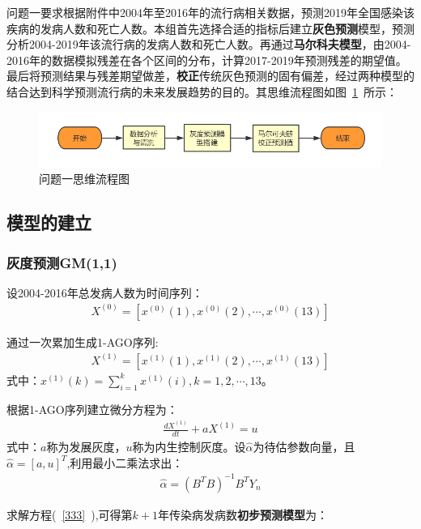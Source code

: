 \documentclass{whutmod}
\begin{document}
    问题一要求根据附件中2004年至2016年的流行病相关数据，预测2019年全国感染该疾病的发病人数和死亡人数。本组首先选择合适的指标后建立\textbf{灰色预测}模型，预测分析2004-2019年该流行病的发病人数和死亡人数。再通过\textbf{马尔科夫模型}，由2004-2016年的数据模拟残差在各个区间的分布，计算2017-2019年预测残差的期望值。最后将预测结果与残差期望做差，\textbf{校正}传统灰色预测的固有偏差，经过两种模型的结合达到科学预测流行病的未来发展趋势的目的。其思维流程图如图~\ref{lct}~所示：

       \begin{figure}[H]
   	\centering
   	\includegraphics[width=\textwidth]{figures/lctc.png}
   	\caption{问题一思维流程图}\label{lct}
   \end{figure}

   
	    \subsection{模型的建立}
	    \subsubsection{灰度预测GM(1,1)}
	    设2004-2016年总发病人数为时间序列：
	     \begin{gather*}
	    X^{(0)}=[x^{(0)}(1),x^{(0)}(2),\cdots,x^{(0)}(13)]
	    \end{gather*}
	    
	    通过一次累加生成1-AGO序列:
	    \begin{gather*}
	    X^{(1)}=[x^{(1)}(1),x^{(1)}(2),\cdots,x^{(1)}(13)]
	    \end{gather*}
	    式中：$x^{(1)}(k)=\sum_{i=1}^{k}x^{(1)}(i),k=1,2,\cdots,13$。
	    
	    根据1-AGO序列建立微分方程为\cite{bib:one}：
	     \begin{gather}\label{333}
	    \frac{d X^{(1)}}{dt}+a X^{(1)} = u
	     \end{gather}
	     式中：$a$称为发展灰度，$u$称为内生控制灰度。设$\widehat{\alpha}$为待估参数向量，且$\widehat{\alpha }=[a,u]^T$,利用最小二乘法求出：
	     \begin{gather}
	     \widehat{\alpha }=(B^TB)^{-1}B^{T}Y_{n}
	     \end{gather}

	     
	     求解方程(~\ref{333}~),可得第$k+1$年传染病发病数\textbf{初步预测模型}为：
\end{document}
